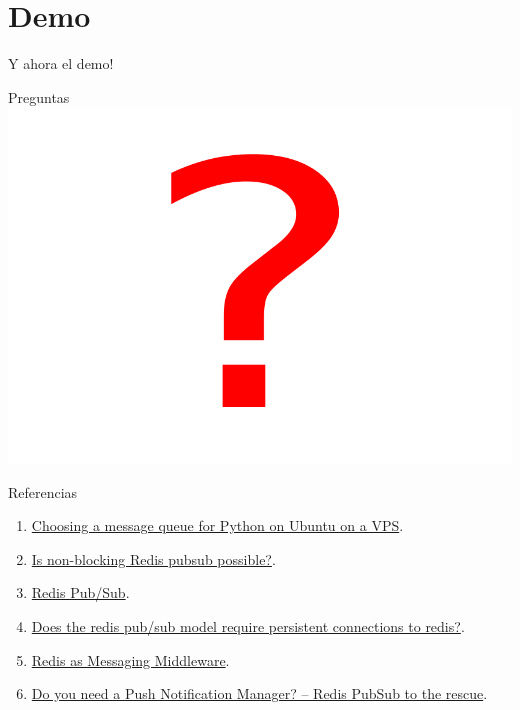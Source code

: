 \documentclass[spanish,xcolor=dvipsnames]{beamer}
\begin{document}
\section{Demo}

\begin{frame}
  \begin{center}
  \Huge
  Y ahora el demo!
  \end{center}
\end{frame}

\begin{frame}[plain]{Preguntas}
   \includegraphics[width=\linewidth]{images/question.png}
\end{frame}

\begin{frame}[plain]{Referencias}
  \begin{enumerate}\addtolength{\itemsep}{0.5\baselineskip}
    \item \href{http://www.darkcoding.net/software/choosing-a-message-queue-for-python-on-ubuntu-on-a-vps/}
               {Choosing a message queue for Python on Ubuntu on a VPS}.
    \item \href{http://stackoverflow.com/questions/7871526/is-non-blocking-redis-pubsub-possible}
               {Is non-blocking Redis pubsub possible?}.
    \item \href{http://redis.io/topics/pubsub}
               {Redis Pub/Sub}.
    \item \href{http://stackoverflow.com/a/7672670/253049}
               {Does the redis pub/sub model require persistent connections to redis?}.
    \item \href{http://pkghosh.wordpress.com/2012/03/28/redis-as-messaging-middleware/}
               {Redis as Messaging Middleware}.
    \item \href{http://blog.joshsoftware.com/2011/01/03/do-you-need-a-push-notification-manager-redis-pubsub-to-the-rescue/}
               {Do you need a Push Notification Manager? – Redis PubSub to the rescue}.
  \end{enumerate}
\end{frame}
\end{document}
